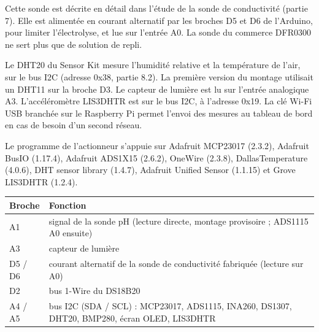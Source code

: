 \noindent Cette sonde est décrite en détail dans l'étude de la sonde de conductivité (partie 7). Elle est alimentée en courant alternatif par les broches D5 et D6 de l'Arduino, pour limiter l'électrolyse, et lue sur l'entrée A0. La sonde du commerce DFR0300 ne sert plus que de solution de repli.

\noindent Le DHT20 du Sensor Kit mesure l'humidité relative et la température de l'air, sur le bus I2C (adresse 0x38, partie 8.2). La première version du montage utilisait un DHT11 sur la broche D3. Le capteur de lumière est lu sur l'entrée analogique A3. L'accéléromètre LIS3DHTR est sur le bus I2C, à l'adresse 0x19. La clé Wi-Fi USB branchée sur le Raspberry Pi permet l'envoi des mesures au tableau de bord en cas de besoin d'un second réseau.

\noindent Le programme de l'actionneur s'appuie sur Adafruit MCP23017 (2.3.2), Adafruit BusIO (1.17.4), Adafruit ADS1X15 (2.6.2), OneWire (2.3.8), DallasTemperature (4.0.6), DHT sensor library (1.4.7), Adafruit Unified Sensor (1.1.15) et Grove LIS3DHTR (1.2.4).

\noindent
\begin{table}[H]
\centering
\begin{tabularx}{\linewidth}{lY}
\hline
Broche & Fonction \\
\hline
A1 & signal de la sonde pH (lecture directe, montage provisoire ; ADS1115 A0 ensuite) \\
A3 & capteur de lumière \\
D5 / D6 & courant alternatif de la sonde de conductivité fabriquée (lecture sur A0) \\
D2 & bus 1-Wire du DS18B20 \\
A4 / A5 & bus I2C (SDA / SCL) : MCP23017, ADS1115, INA260, DS1307, DHT20, BMP280, écran OLED, LIS3DHTR \\
\hline
\end{tabularx}
\end{table}
